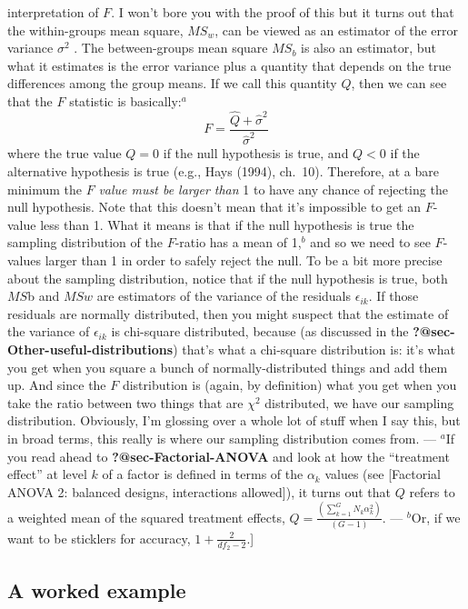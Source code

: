 \documentclass[
  a4paper,
]{book}
\begin{document}
{  interpretation of \(F\). I won't bore you with the proof of this but
  it turns out that the within-groups mean square, \(MS_w\), can be
  viewed as an estimator of the error variance \(\sigma^2\) . The
  between-groups mean square \(MS_b\) is also an estimator, but what it
  estimates is the error variance plus a quantity that depends on the
  true differences among the group means. If we call this quantity
  \(Q\), then we can see that the \(F\) statistic is basically:\(^a\)
  \[F=\frac{\hat{Q}+\hat{\sigma}^2}{\hat{\sigma}^2}\] where the true
  value \(Q = 0\) if the null hypothesis is true, and \(Q < 0\) if the
  alternative hypothesis is true (e.g., Hays (1994), ch.~10). Therefore,
  at a bare minimum the \(F\) \emph{value must be larger than} 1 to have
  any chance of rejecting the null hypothesis. Note that this doesn't
  mean that it's impossible to get an \(F\)-value less than 1. What it
  means is that if the null hypothesis is true the sampling distribution
  of the \(F\)-ratio has a mean of 1,\(^b\) and so we need to see
  \(F\)-values larger than 1 in order to safely reject the null. To be a
  bit more precise about the sampling distribution, notice that if the
  null hypothesis is true, both \(MS\)b and \(MSw\) are estimators of
  the variance of the residuals \(\epsilon_{ik}\). If those residuals
  are normally distributed, then you might suspect that the estimate of
  the variance of \(\epsilon_{ik}\) is chi-square distributed, because
  (as discussed in the \textbf{?@sec-Other-useful-distributions}) that's
  what a chi-square distribution is: it's what you get when you square a
  bunch of normally-distributed things and add them up. And since the
  \(F\) distribution is (again, by definition) what you get when you
  take the ratio between two things that are \(\chi^2\) distributed, we
  have our sampling distribution. Obviously, I'm glossing over a whole
  lot of stuff when I say this, but in broad terms, this really is where
  our sampling distribution comes from. --- \(^a\)If you read ahead to
  \textbf{?@sec-Factorial-ANOVA} and look at how the ``treatment
  effect'' at level \(k\) of a factor is defined in terms of the
  \(\alpha_k\) values (see {[}Factorial ANOVA 2: balanced designs,
  interactions allowed{]}), it turns out that \(Q\) refers to a weighted
  mean of the squared treatment effects,
  \(Q = \frac{(\sum_{k=1}^{G}N_k \alpha_k^2)}{(G-1)}\). --- \(^b\)Or, if
  we want to be sticklers for accuracy, \(1+ \frac{2}{df_2-2}\).}{]}

\hypertarget{a-worked-example}{%
\subsection{A worked example}\label{a-worked-example}}
\end{document}

